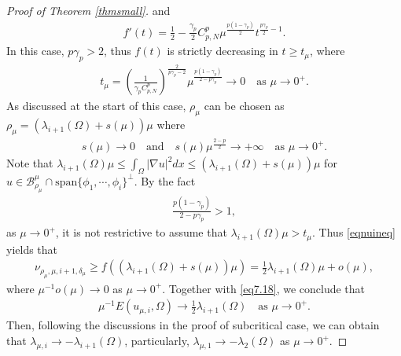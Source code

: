 \documentclass[10pt,a4paper]{amsart}
\newcommand{\B}{\mathcal{B}}
\newcommand{\ga}{\gamma}
\newcommand{\la}{\lambda}
\begin{document}
\begin{proof}[Proof of Theorem \ref{thmsmall}]
and
\begin{align*}
	f'(t) = \frac12 - \frac{\ga_p}2 C_{p,N}^p \mu^{\frac{p(1-\ga_p)}{2}}t ^{\frac{p\ga_p}{2}-1}.
\end{align*}
In this case, $p\ga_p > 2$, thus $f(t)$ is strictly decreasing in $t \ge t_\mu$,
where
\begin{align*}
	t_\mu = \left( \frac{1}{\ga_pC_{p,N}^p}\right) ^{\frac{2}{p\ga_p-2}}\mu^{\frac{p(1-\ga_p)}{2-p\ga_p}} \to 0 \quad \text{as } \mu \to 0^+.
\end{align*}
As discussed at the start of this case, $\rho_\mu$ can be chosen as $\rho_\mu = (\la_{i+1}(\Omega)+s(\mu))\mu$ where
\begin{align*}
	s(\mu) \to 0 \quad \text{and} \quad s(\mu)\mu^{\frac{2-p}{2}} \to +\infty \quad \text{as } \mu \to 0^+.
\end{align*}
Note that $\la_{i+1}(\Omega)\mu \le \int_\Omega |\nabla u|^2dx \le (\la_{i+1}(\Omega)+s(\mu))\mu$ for $u \in \B_{\rho_\mu}^\mu \cap \text{span}\{\phi_1,\cdots,\phi_{i}\}^{\bot}$. By the fact
\begin{align*}
	\frac{p(1-\ga_p)}{2-p\ga_p} > 1,
\end{align*}
as $\mu \to 0^+$, it is not restrictive to assume that $\la_{i+1}(\Omega)\mu > t_\mu$. Thus \eqref{eqnuineq} yields that
\begin{align*}
	\nu_{\rho_\mu,\mu,i+1,\delta_\mu} \geq f((\la_{i+1}(\Omega)+s(\mu))\mu) = \frac12\la_{i+1}(\Omega)\mu + o(\mu),
\end{align*}
where $\mu^{-1}o(\mu) \to 0$ as $\mu \to 0^+$. Together with \eqref{eq7.18}, we conclude that
\begin{align*}
	\mu^{-1}E(u_{\mu,i},\Omega) \to \frac12\la_{i+1}(\Omega) \quad \text{as } \mu \to 0^+.
\end{align*}
Then, following the discussions in the proof of subcritical case, we can obtain that $\la_{\mu,i} \to -\la_{i+1}(\Omega)$, particularly, $\la_{\mu,1} \to -\la_2(\Omega)$ as $\mu \to 0^+$.


\end{proof}
\end{document}
